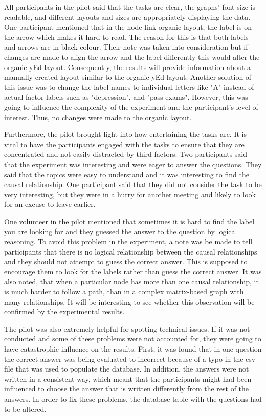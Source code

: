 \documentclass{l4proj}
\begin{document}
All participants in the pilot said that the tasks are clear, the graphs' font size is readable, and different layouts and sizes are appropriately displaying the data. One participant mentioned that in the node-link organic layout, the label is on the arrow which makes it hard to read. The reason for this is that both labels and arrows are in black colour. Their note was taken into consideration but if changes are made to align the arrow and the label differently this would alter the organic yEd layout. Consequently, the results will provide information about a manually created layout similar to the organic yEd layout. Another solution of this issue was to change the label names to individual letters like "A" instead of actual factor labels such as "depression", and "pass exams". However, this was going to influence the complexity of the experiment and the participant's level of interest. Thus, no changes were made to the organic layout.

Furthermore, the pilot brought light into how entertaining the tasks are. It is vital to have the participants engaged with the tasks to ensure that they are concentrated and not easily distracted by third factors. Two participants said that the experiment was interesting and were eager to answer the questions. They said that the topics were easy to understand and it was interesting to find the causal relationship. One participant said that they did not consider the task to be very interesting, but they were in a hurry for another meeting and likely to look for an excuse to leave earlier.  

One volunteer in the pilot mentioned that sometimes it is hard to find the label you are looking for and they guessed the answer to the question by logical reasoning. To avoid this problem in the experiment, a note was be made to tell participants that there is no logical relationship between the causal relationships and they should not attempt to guess the correct answer. This is supposed to encourage them to look for the labels rather than guess the correct answer. It was also noted, that when a particular node has more than one causal relationship, it is much harder to follow a path, than in a complex matrix-based graph with many relationships. It will be interesting to see whether this observation will be confirmed by the experimental results.

The pilot was also extremely helpful for spotting technical issues. If it was not conducted and some of these problems were not accounted for, they were going to have catastrophic influence on the results. First, it was found that in one question the correct answer was being evaluated to incorrect because of a typo in the csv file that was used to populate the database. In addition, the answers were not written in a consistent way, which meant that the participants might had been influenced to choose the answer that is written differently from the rest of the answers. In order to fix these problems, the database table with the questions had to be altered. 
\end{document}
